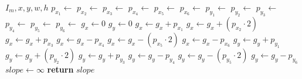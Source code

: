 \begin{algorithm}[ht]
\caption{}
\label{alg:gradientintensity}
\begin{algorithmic}[1]
	\Require $I_m, x, y, w, h$
	\State $p_{x_1} \gets$ 
	\label{alg:gradientintensity-readstart}
	\State $p_{x_2} \gets$ 
	\State $p_{x_3} \gets$ 
	\State $p_{x_4} \gets$ 
	\State $p_{x_5} \gets$ 
	\State $p_{x_6} \gets$ 
	\State $p_{y_1} \gets$ 
	\State $p_{y_2} \gets$ 
	\State $p_{y_3} \gets$ 
	\State $p_{y_4} \gets$ 
	\State $p_{y_5} \gets$ 
	\State $p_{y_6} \gets$ 
	\label{alg:gradientintensity-readend}
	\State $g_x \gets 0$
	\State $g_y \gets 0$
	\State $g_x \gets g_x + p_{x_1}$
	\label{alg:gradientintensity-convolutestart}
	\State $g_x \gets g_x + \left(p_{x_2} \cdot 2\right)$
	\State $g_x \gets g_x + p_{x_3}$
	\State $g_x \gets g_x - p_{x_4}$
	\State $g_x \gets g_x - \left(p_{x_5} \cdot 2\right)$
	\State $g_x \gets g_x - p_{x_6}$
	\State $g_y \gets g_y + p_{y_1}$
	\State $g_y \gets g_y + \left(p_{y_2} \cdot 2\right)$
	\State $g_y \gets g_y + p_{y_3}$
	\State $g_y \gets g_y - p_{y_4}$
	\State $g_y \gets g_y - \left(p_{y_5} \cdot 2\right)$
	\State $g_y \gets g_y - p_{y_6}$
	\label{alg:gradientintensity-convoluteend}
	\State $\mathit{slope} \gets \infty$
	\State {}
	\label{alg:gradientintensity-vector-start}
	\State {}
	\label{alg:gradientintensity-vector-end}
	\State \textbf{return} $\mathit{slope}$
\end{algorithmic}
\end{algorithm}
